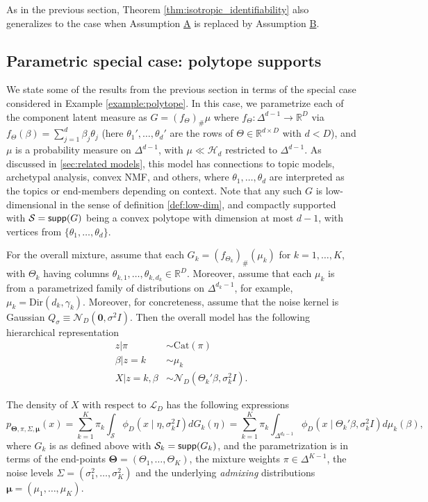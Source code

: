 \documentclass[bj,authoryear]{imsart}
\theoremstyle{plain}
\theoremstyle{remark}
\def\bTheta{{\boldsymbol\Theta}}
\def\bmu{{\boldsymbol\mu}}
\def\bbR{\mathbb{R}}
\def\cH{\mathcal{H}}
\def\cL{\mathcal{L}}
\def\cN{\mathcal{N}}
\def\cS{\mathcal{S}}
\def\supp{{\sf supp}}
\def\bTheta{\boldsymbol{\Theta}}
\begin{document}
As in the previous section, Theorem \ref{thm:isotropic_identifiability} also generalizes to the case when Assumption \hyperref[assume:A]{A} is replaced by Assumption \hyperref[assume:B]{B}.


\subsection{Parametric special case: polytope supports}
\label{sec: polytope case}

We state some of the results from the previous section in terms of the special case considered in Example \ref{example:polytope}. In this case, we parametrize each of the component latent measure as $G=(f_\Theta)_{\#}\mu$ where $f_{\Theta}:\Delta^{d-1}\to \bbR^D$ via $f_{\Theta}(\beta)=\sum_{j=1}^d \beta_j\theta_{j}$ (here $\theta_1',\dots,\theta_d'$ are the rows of $\Theta\in\bbR^{d\times D}$ with $d<D$), and $\mu$ is a probability measure on $\Delta^{d-1}$, with $\mu\ll \cH_d$ restricted to $\Delta^{d-1}$. As discussed in \ref{sec:related models}, this model has connections to topic models, archetypal analysis, convex NMF, and others, where $\theta_1,\dots,\theta_d$ are interpreted as the topics or end-members depending on context. Note that any such $G$ is low-dimensional in the sense of definition \ref{def:low-dim}, and compactly supported with $\cS=\supp(G)$ being a convex polytope with dimension at most $d-1$, with vertices from $\{\theta_1,\dots,\theta_d\}$.

For the overall mixture, assume that each $G_k=(f_{\Theta_k})_{\#}(\mu_k)$ for $k=1,\dots,K$, with $\Theta_k$ having columns $\theta_{k,1},\dots,\theta_{k,d_k}\in\bbR^D$. Moreover, assume that each $\mu_k$ is from a parametrized family of distributions on $\Delta^{d_k-1}$, for example, $\mu_k=\text{Dir}(d_k, \gamma_k)$. Moreover, for concreteness, assume that the noise kernel is Gaussian $Q_{\sigma}\equiv \cN_D(\boldsymbol{0}, \sigma^2 I)$. Then the overall model has the following hierarchical representation
\begin{equation}
    \begin{aligned}
        z|\pi &\sim \text{Cat}(\pi) \\
        \beta | z=k &\sim \mu_k \\
        X | z=k, \beta &\sim \cN_D\left(\Theta_k'\beta, \sigma_k^2 I\right).
    \end{aligned}
\end{equation}

The density of $X$ with respect to $\cL_D$ has the following expressions
\begin{equation}\label{eq: polytope density}
    p_{\bTheta, \pi, \Sigma, \bmu}(x) = \sum_{k=1}^K \pi_k \int_{\cS} \phi_D(x \mid \eta, \sigma_k^2 I) dG_k(\eta) = \sum_{k=1}^K \pi_k \int_{\Delta^{d_k-1}} \phi_D(x \mid \Theta_k'\beta, \sigma_k^2 I) d\mu_k(\beta),
\end{equation}
where $G_k$ is as defined above with $\cS_k=\supp(G_k)$, and the parametrization is in terms of the end-points $\bTheta=(\Theta_1,\dots,\Theta_K)$, the mixture weights $\pi\in\Delta^{K-1}$, the noise levels $\Sigma=(\sigma_1^2,\dots,\sigma_K^2)$ and the underlying \textit{admixing} distributions $\bmu=(\mu_1,\dots,\mu_K)$. 
\end{document}
